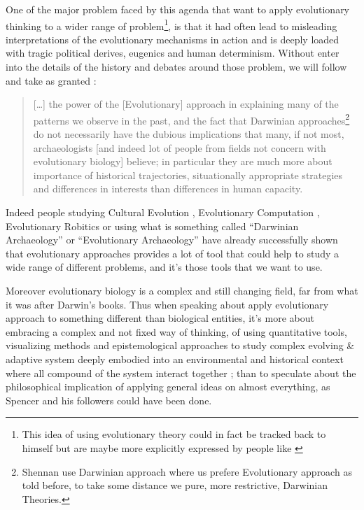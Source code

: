 \documentclass[a4paper]{article}
\begin{document}
One of the major problem faced by this agenda that want to apply evolutionary thinking to a wider range of problem\footnote{This idea of using evolutionary theory could in fact be tracked back to \cite{darwin1871thedescentofman} himself but are maybe more explicitly expressed by people like \cite{spencer1864theprinciplesofbiology}}, is that it had often lead to misleading interpretations of the evolutionary mechanisms in action and is deeply loaded with tragic political derives, eugenics and human determinism. Without enter into the details of the history and debates around those problem, we will follow \cite{shennan2002genes} and take as granted :
\begin{quote}
	[\ldots] the power of the [Evolutionary] approach in explaining many of the patterns we observe in the past, and the fact that Darwinian approaches\footnote{Shennan use Darwinian approach where us prefere Evolutionary approach as told before, to take some distance we pure, more restrictive, Darwinian Theories.}  do not necessarily have the dubious implications that many, if not most, archaeologists [and indeed lot of people from fields not concern with evolutionary biology] believe; in particular they are much more about importance of historical trajectories, situationally appropriate strategies and differences in interests than differences in human capacity.\\
	\cite[p. 14]{shennan2002genes}
\end{quote}
Indeed people studying Cultural Evolution \citep{mesoudi2015culturalevolutionareviewoftheoryfindingsandcontroversies}, Evolutionary Computation \citep{eiben03introductiontoevolutionarycomputing}, Evolutionary Robitics \citep{nolfi00evolrobobiolintetechselfmach} or using what is something called ``Darwinian Archaeology''\citep{shennan2002genes} or ``Evolutionary Archaeology'' have already successfully shown that evolutionary approaches provides a lot of tool that could help to study a wide range of different problems, and it's those tools that we want to use.  

Moreover evolutionary biology is a complex and still changing field, far from what it was after Darwin's books. Thus when speaking about apply evolutionary approach to something different than biological entities, it's more about embracing a complex and not fixed way of thinking, of using quantitative tools, visualizing methods and epistemological approaches to study complex evolving \& adaptive system deeply embodied into an environmental and historical context where all compound of the system interact together ; than to speculate about the philosophical implication of applying general ideas on almost everything, as Spencer and his followers could have been done.
\end{document}
